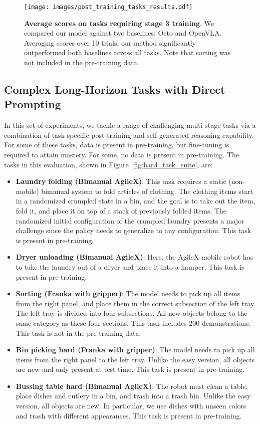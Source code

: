 \begin{figure}[t]
    \centering
    \texttt{[image: images/post\_training\_tasks\_results.pdf]}
    \caption{\textbf{Average scores on tasks requiring stage 3 training}. We compared our model against two baselines: Octo and OpenVLA. Averaging scores over 10 trials, our method significantly outperformed both baselines across all tasks. Note that sorting was not included in the pre-training data.}\label{fig:post_training_results}
\end{figure}

\subsection{Complex Long-Horizon Tasks with Direct Prompting}
\label{sec:direct_prompting}
In this set of experiments, we tackle a range of challenging multi-stage tasks via a combination of task-specific post-training and self-generated reasoning capability. For some of these tasks, data is present in pre-training, but fine-tuning is required to attain mastery. For some, no data is present in pre-training. The tasks in this evaluation, shown in Figure~\ref{fig:hard_task_suite}, are:

\begin{itemize}
    \item \textbf{Laundry folding (Bimanual AgileX)}: This task requires a static (non-mobile) bimanual system to fold articles of clothing. The clothing items start in a randomized crumpled state in a bin, and the goal is to take out the item, fold it, and place it on top of a stack of previously folded items. The randomized initial configuration of the crumpled laundry presents a major challenge since the policy needs to generalize to any configuration. This task is present in pre-training.
    \item \textbf{Dryer unloading (Bimanual AgileX)}: Here, the AgileX mobile robot has to take the laundry out of a dryer and place it into a hamper. This task is present in pre-training.
    \item \textbf{Sorting (Franka with gripper)}: The model needs to pick up all items from the right panel, and place them in the correct subsection of the left tray. The left tray is divided into four subsections. All new objects belong to the same category as these four sections. This task includes 200 demonstrations. This task is not in the pre-training data. 
    \item \textbf{Bin picking hard (Franka with gripper)}: The model needs to pick up all items from the right panel to the left tray. Unlike the easy version, all objects are new and only present at test time. This task is present in pre-training.
    \item \textbf{Bussing table hard (Bimanual AgileX)}: The robot must clean a table, place dishes and cutlery in a bin, and trash into a trash bin. Unlike the easy version, all objects are new. In particular, we use dishes with unseen colors and trash with different appearances. This task is present in pre-training.
\end{itemize}

